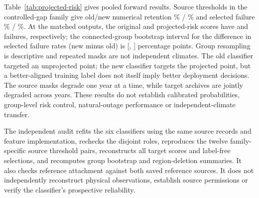 Table~\ref{tab:projected-risk} gives pooled forward results. Source thresholds in the controlled-gap family give old/new numerical retention \PROldRetention\% / \PRNewRetention\% and selected failure \PROldFailure\% / \PRNewFailure\%. At the matched \PRMatchedCount{} outputs, the original and projected-risk scores have \PRMatchedOldBad{} and \PRMatchedNewBad{} failures, respectively; the connected-group bootstrap interval for the difference in selected failure rates (new minus old) is [\PRMatchedLow, \PRMatchedHigh] percentage points. Group resampling is descriptive and repeated masks are not independent climates. The old classifier targeted an unprojected point; the new classifier targets the projected point, but a better-aligned training label does not itself imply better deployment decisions. The source masks degrade one year at a time, while target archives are jointly degraded across years. These results do not establish calibrated probabilities, group-level risk control, natural-outage performance or independent-climate transfer.

\begin{table}[ht]
\caption{Forward annual failure comparison, old raw score / projected-point score. An error exceeds 0.5 $^{\circ}$C. Source-threshold counts can differ; the target count match is transductive and uses no target outcomes.}
\label{tab:projected-risk}\centering\small
{}\end{table}

The independent audit refits the six classifiers using the same source records and feature implementation, rechecks the disjoint roles, reproduces the twelve family-specific source threshold pairs, reconstructs all target scores and label-free selections, and recomputes group bootstrap and region-deletion summaries. It also checks reference attachment against both saved reference sources. It does not independently reconstruct physical observations, establish source permissions or verify the classifier's prospective reliability.
